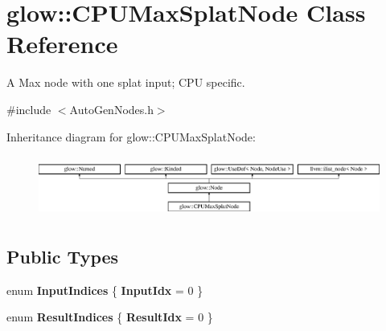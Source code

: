\hypertarget{classglow_1_1_c_p_u_max_splat_node}{}\section{glow\+:\+:C\+P\+U\+Max\+Splat\+Node Class Reference}
\label{classglow_1_1_c_p_u_max_splat_node}


A Max node with one splat input; C\+PU specific.  




{\ttfamily \#include $<$Auto\+Gen\+Nodes.\+h$>$}

Inheritance diagram for glow\+:\+:C\+P\+U\+Max\+Splat\+Node\+:\begin{figure}[H]
\begin{center}
\leavevmode
\includegraphics[height=2.028986cm]{classglow_1_1_c_p_u_max_splat_node}
\end{center}
\end{figure}
\subsection*{Public Types}
\begin{DoxyCompactItemize}
\item 
\mbox{\label{classglow_1_1_c_p_u_max_splat_node_ac5c6a6563f933affc80f863a08bde672}} 
enum {\bfseries Input\+Indices} \{ {\bfseries Input\+Idx} = 0
 \}
\item 
\mbox{\label{classglow_1_1_c_p_u_max_splat_node_aa2ee22f972d0a168692626fb8442ca08}} 
enum {\bfseries Result\+Indices} \{ {\bfseries Result\+Idx} = 0
 \}
\end{DoxyCompactItemize}
